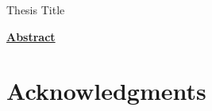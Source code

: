 \documentclass[letterpaper, 12pt, oneside]{book}
\theoremstyle{definition}
\theoremstyle{remark}
\numberwithin{equation}{section}
\numberwithin{figure}{section}
\begin{document}
    \centerline{\large Thesis Title}
    
    \vspace{0.3in}
    
    \centerline{\textbf{\underline{Abstract}}}
    
    \vspace{0.2in}
    
        
    
    \newpage
    

    \chapter*{\vspace{5in}}

        
    
    \newpage


       

    \chapter*{\vspace{-1.5in}Acknowledgments}

        
    
    \newpage
       
   
\end{document}
